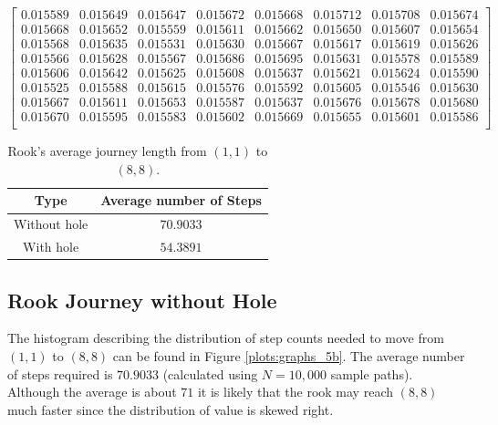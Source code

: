 \documentclass{amsart}
\numberwithin{equation}{section}
\begin{document}
\begin{equation}
    \label{eq:matrix_1}
     \begin{bmatrix}
       0.015589 &  0.015649 &  0.015647 &  0.015672 &  0.015668 &  0.015712 &  0.015708 &  0.015674 \\
       0.015668 &  0.015652 &  0.015559 &  0.015611 &  0.015662 &  0.015650 &  0.015607 &  0.015654 \\
       0.015568 &  0.015635 &  0.015531 &  0.015630 &  0.015667 &  0.015617 &  0.015619 &  0.015626 \\
       0.015566 &  0.015628 &  0.015567 &  0.015686 &  0.015695 &  0.015631 &  0.015578 &  0.015589 \\
       0.015606 &  0.015642 &  0.015625 &  0.015608 &  0.015637 &  0.015621 &  0.015624 &  0.015590 \\
       0.015525 &  0.015588 &  0.015615 &  0.015576 &  0.015592 &  0.015605 &  0.015546 &  0.015630 \\
       0.015667 &  0.015611 &  0.015653 &  0.015587 &  0.015637 &  0.015676 &  0.015678 &  0.015680 \\
       0.015670 &  0.015595 &  0.015583 &  0.015602 &  0.015669 &  0.015655 &  0.015601 &  0.015586 \\
   \end{bmatrix}
\end{equation}


\begin{table}[]
    \centering
    \begin{tabular}{|c|c|}
        \hline
        Type & Average number of Steps \\
        \hline
        Without hole & $70.9033$\\
        \hline
        With hole & $54.3891$\\
        \hline
    \end{tabular}
    \caption{Rook's average journey length from $(1,1)$ to $(8,8)$.}
    \label{tab:avg_steps}
\end{table}

\subsection{Rook Journey without Hole}
The histogram describing the distribution of step counts needed to move from $(1,1)$ to $(8,8)$ can be found in Figure \ref{plots:graphs_5b}. The average number of steps required is $70.9033$ (calculated using $N=10,000$ sample paths). Although the average is about $71$ it is likely that the rook may reach $(8,8)$ much faster since the distribution of value is skewed right.
\end{document}
